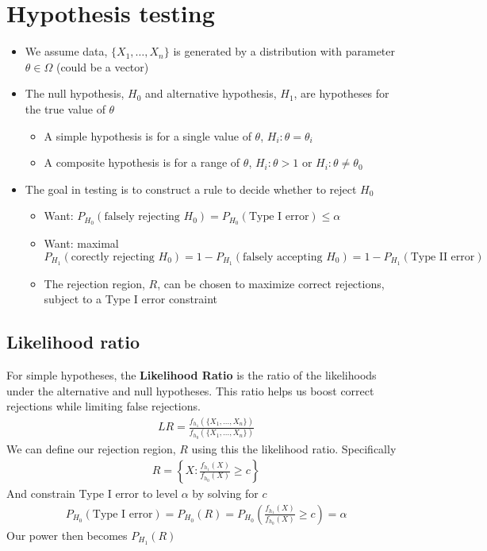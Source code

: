 \documentclass{article}
\begin{document}
\section{Hypothesis testing}
\begin{itemize}
    \item We assume data, $\{X_1, \dots, X_n\}$ is generated by a distribution with parameter $\theta \in \Omega$ (could be a vector)
    \item The null hypothesis, $H_0$ and alternative hypothesis, $H_1$, are hypotheses for the true value of $\theta$
    \begin{itemize}
        \item A simple hypothesis is for a single value of $\theta$, $H_i: \theta = \theta_i$
        \item A composite hypothesis is for a range of $\theta$, $H_i: \theta > 1$ or $H_i: \theta \neq \theta_0$ 
    \end{itemize}
    \item The goal in testing is to construct a rule to decide whether to reject $H_0$
    \begin{itemize}
        \item Want: $P_{H_0}(\textrm{falsely rejecting } H_0) =  P_{H_0}(\textrm{Type I error})\leq \alpha$
        \item Want: maximal $P_{H_1}(\textrm{corectly rejecting } H_0) = 1 - P_{H_1}(\textrm{falsely accepting } H_0)= 1 - P_{H_1}(\textrm{Type II error})$
        \item The rejection region, $R$, can be chosen to maximize correct rejections, subject to a Type I error constraint
    \end{itemize}
\end{itemize}

\subsection{Likelihood ratio}
For \textrm{simple hypotheses}, the \textbf{Likelihood Ratio} is the ratio of the likelihoods under the alternative and null hypotheses. This ratio helps us boost correct rejections while limiting false rejections.
\begin{align*}
    LR = \frac{f_{h_1}(\{X_1, \dots, X_n\})}{f_{h_0}(\{X_1, \dots, X_n\})}
\end{align*}
We can define our rejection region, $R$ using this the likelihood ratio. Specifically
\begin{align*}
    R = \left\{ X: \frac{f_{h_1}(X)}{f_{h_0}(X)}\geq c \right\} 
\end{align*}
And constrain Type I error to level $\alpha$ by solving for $c$
\begin{align*}
    P_{H_0}(\textrm{Type I error}) = P_{H_0}(R) = P_{H_0}\left(\frac{f_{h_1}(X)}{f_{h_0}(X)}\geq c\right) =\alpha
\end{align*}
Our power then becomes $P_{H_1}(R)$
\end{document}
